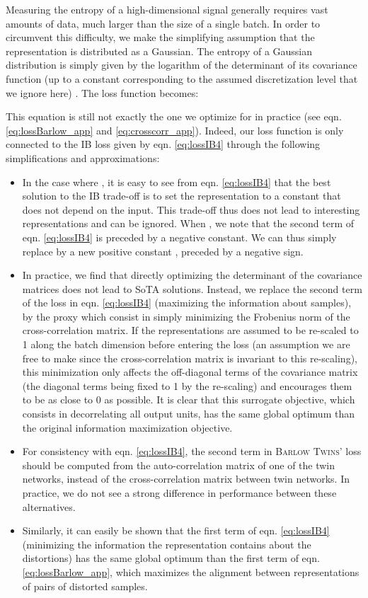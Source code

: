 \documentclass{article}
\newcommand{\AlgoName}{\textsc{Barlow Twins}}
\begin{document}
Measuring the entropy of a high-dimensional signal generally requires vast amounts of data, much larger than the size of a single batch. In order to circumvent this difficulty, we make the simplifying assumption that the representation  is distributed as a Gaussian. The entropy of a Gaussian distribution is simply given by the logarithm of the determinant of its covariance function (up to a constant corresponding to the assumed discretization level that we ignore here) \cite{cai_law_2015}. The loss function becomes:  



This equation is still not exactly the one we optimize for in practice (see eqn. \ref{eq:lossBarlow_app} and \ref{eq:crosscorr_app}). Indeed, our loss function is only connected to the IB loss given by eqn. \ref{eq:lossIB4} through the following simplifications and approximations:
\begin{itemize}
  \item In the case where , it is easy to see from eqn. \ref{eq:lossIB4} that the best solution to the IB trade-off is to set the representation to a constant that does not depend on the input. This trade-off thus does not lead to interesting representations and can be ignored. When , we note that the second term of eqn. \ref{eq:lossIB4} is preceded by a negative constant. We can thus simply replace  by a new positive constant , preceded by a negative sign.
  
  \item In practice, we find that directly optimizing the determinant of the covariance matrices does not lead to SoTA solutions. Instead, we replace the second term of the loss in eqn. \ref{eq:lossIB4} (maximizing the information about samples), by the proxy which consist in simply minimizing the Frobenius norm of the cross-correlation matrix. If the representations are assumed to be re-scaled to 1 along the batch dimension before entering the loss (an assumption we are free to make since the cross-correlation matrix is invariant to this re-scaling), this minimization only affects the off-diagonal terms of the covariance matrix
  (the diagonal terms being fixed to 1 by the re-scaling) and encourages them to be as close to 0 as possible. It is clear that this surrogate objective, which consists in decorrelating all output units, has the same global optimum than the original information maximization objective. 
  
  \item For consistency with eqn. \ref{eq:lossIB4}, the second term in \AlgoName' loss should be computed from the auto-correlation matrix of one of the twin networks, instead of the cross-correlation matrix between twin networks. In practice, we do not see a strong difference in performance between these alternatives.
  
  \item Similarly, it can easily be shown that the first term of eqn. \ref{eq:lossIB4} (minimizing the information the representation contains about the distortions) has the same global optimum than the first term of eqn. \ref{eq:lossBarlow_app}, which maximizes the alignment between representations of pairs of distorted samples.  
\end{itemize}
\end{document}

